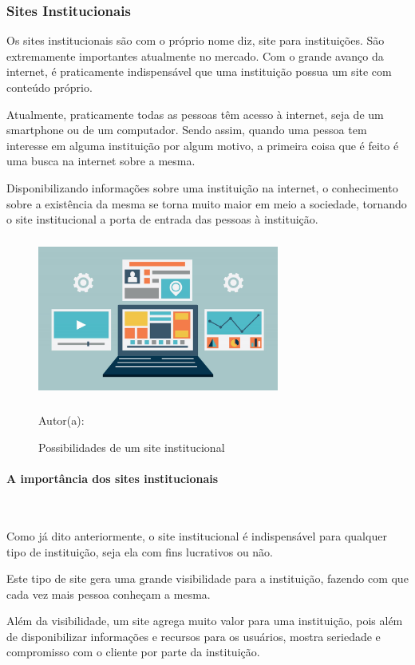 \subsubsection{Sites Institucionais}
Os sites institucionais são com o próprio nome diz, site para instituições. São extremamente importantes atualmente no mercado. Com o grande avanço da internet, é praticamente indispensável que uma instituição possua um site com conteúdo próprio.

Atualmente, praticamente todas as pessoas têm acesso à internet, seja de um smartphone ou de um computador. Sendo assim, quando uma pessoa tem interesse em alguma instituição por algum motivo, a primeira coisa que é feito é uma busca na internet sobre a mesma.

Disponibilizando informações sobre uma instituição na internet, o conhecimento sobre a existência da mesma se torna muito maior em meio a sociedade, tornando o site institucional a porta de entrada das pessoas à instituição.
 \begin{figure}[!h]
	\centering
	\caption{Possibilidades de um site institucional }
	\includegraphics[width=300px, height=200px]{./images/2-4.jpg}
	\par{Autor(a): \cite{markeninja}}
\end{figure}

\paragraph{A importância dos sites institucionais}\mbox{}\\
\par
Como já dito anteriormente, o site institucional é indispensável para qualquer tipo de instituição, seja ela com fins lucrativos ou não.

Este tipo de site gera uma grande visibilidade para a instituição, fazendo com que cada vez mais pessoa conheçam a mesma.

Além da visibilidade, um site agrega muito valor para uma instituição, pois além de disponibilizar informações e recursos para os usuários, mostra seriedade e compromisso com o cliente por parte da instituição.

